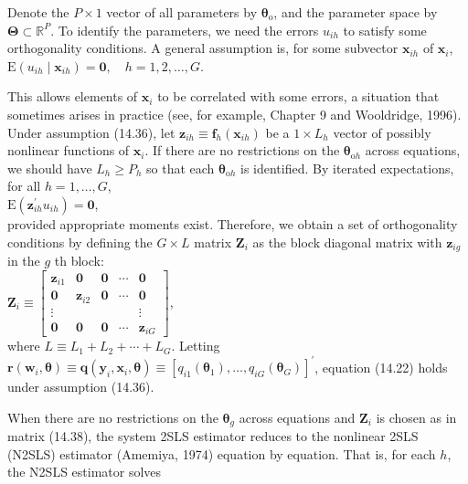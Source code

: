 \documentclass[10pt]{article}
\begin{document}
Denote the $P \times 1$ vector of all parameters by $\boldsymbol{\theta}_{\mathrm{o}}$, and the parameter space by $\boldsymbol{\Theta} \subset \mathbb{R}^{P}$. To identify the parameters, we need the errors $u_{i h}$ to satisfy some orthogonality conditions. A general assumption is, for some subvector $\mathbf{x}_{i h}$ of $\mathbf{x}_{i}$,\\
$\mathrm{E}\left(u_{i h} \mid \mathbf{x}_{i h}\right)=\mathbf{0}, \quad h=1,2, \ldots, G$.

This allows elements of $\mathbf{x}_{i}$ to be correlated with some errors, a situation that sometimes arises in practice (see, for example, Chapter 9 and Wooldridge, 1996). Under assumption (14.36), let $\mathbf{z}_{i h} \equiv \mathbf{f}_{h}\left(\mathbf{x}_{i h}\right)$ be a $1 \times L_{h}$ vector of possibly nonlinear functions of $\mathbf{x}_{i}$. If there are no restrictions on the $\boldsymbol{\theta}_{\mathrm{o} h}$ across equations, we should have $L_{h} \geq P_{h}$ so that each $\boldsymbol{\theta}_{\mathrm{o} h}$ is identified. By iterated expectations, for all $h=1, \ldots, G$,\\
$\mathrm{E}\left(\mathbf{z}_{i h}^{\prime} u_{i h}\right)=\mathbf{0}$,\\
provided appropriate moments exist. Therefore, we obtain a set of orthogonality conditions by defining the $G \times L$ matrix $\mathbf{Z}_{i}$ as the block diagonal matrix with $\mathbf{z}_{i g}$ in the $g$ th block:\\
$\mathbf{Z}_{i} \equiv\left[\begin{array}{ccccc}\mathbf{z}_{i 1} & \mathbf{0} & \mathbf{0} & \cdots & \mathbf{0} \\ \mathbf{0} & \mathbf{z}_{i 2} & \mathbf{0} & \cdots & \mathbf{0} \\ \vdots & & & & \vdots \\ \mathbf{0} & \mathbf{0} & \mathbf{0} & \cdots & \mathbf{z}_{i G}\end{array}\right]$,\\
where $L \equiv L_{1}+L_{2}+\cdots+L_{G}$. Letting $\mathbf{r}\left(\mathbf{w}_{i}, \boldsymbol{\theta}\right) \equiv \mathbf{q}\left(\mathbf{y}_{i}, \mathbf{x}_{i}, \boldsymbol{\theta}\right) \equiv\left[q_{i 1}\left(\boldsymbol{\theta}_{1}\right), \ldots, q_{i G}\left(\boldsymbol{\theta}_{G}\right)\right]^{\prime}$, equation (14.22) holds under assumption (14.36).

When there are no restrictions on the $\boldsymbol{\theta}_{g}$ across equations and $\mathbf{Z}_{i}$ is chosen as in matrix (14.38), the system 2SLS estimator reduces to the nonlinear 2SLS (N2SLS) estimator (Amemiya, 1974) equation by equation. That is, for each $h$, the N2SLS estimator solves
\end{document}
